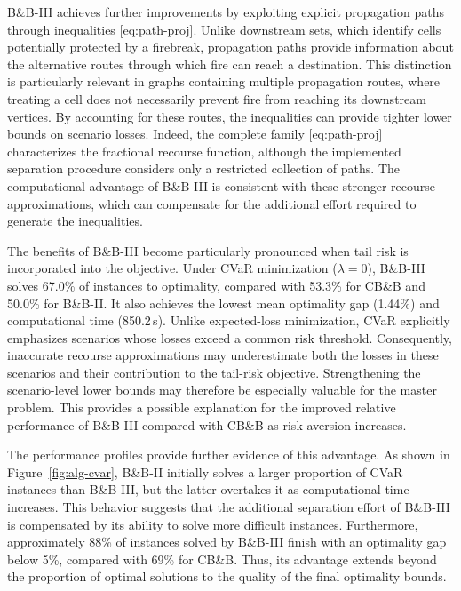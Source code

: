\documentclass{itor}
\begin{document}
B\&B-III achieves further improvements by exploiting explicit propagation paths through inequalities \eqref{eq:path-proj}. Unlike downstream sets, which identify cells potentially protected by a firebreak, propagation paths provide information about the
alternative routes through which fire can reach a destination. This distinction is particularly relevant in graphs containing multiple propagation routes, where treating a cell does not necessarily prevent fire from reaching its downstream vertices. By accounting for these routes, the inequalities can provide tighter
lower bounds on scenario losses. Indeed, the complete family \eqref{eq:path-proj} characterizes the fractional recourse function, although the implemented separation procedure considers only a restricted collection of paths. The computational advantage of
B\&B-III is consistent with these stronger recourse approximations,
which can compensate for the additional effort required to
generate the inequalities.

The benefits of B\&B-III become particularly pronounced when tail risk is incorporated into the objective. Under CVaR minimization ($\lambda=0$), B\&B-III solves 67.0\% of instances to optimality, compared with 53.3\% for CB\&B and 50.0\% for B\&B-II. It also achieves the lowest mean optimality gap (1.44\%) and computational time (850.2\,s). Unlike expected-loss minimization, CVaR explicitly emphasizes scenarios whose losses exceed a common risk threshold. Consequently, inaccurate recourse approximations may underestimate both the losses in these scenarios and their contribution to the tail-risk objective. Strengthening the scenario-level lower bounds may therefore be especially valuable for the master problem. This provides a possible explanation for the improved relative performance of B\&B-III compared with CB\&B as risk aversion increases.

The performance profiles provide further evidence of this advantage. As shown in Figure~\ref{fig:alg-cvar}, B\&B-II initially solves a larger proportion of CVaR instances than B\&B-III, but the latter overtakes it as computational time increases. This behavior suggests that the additional separation effort of B\&B-III is compensated by its ability to solve more difficult instances. Furthermore, approximately 88\% of instances solved by B\&B-III finish with an optimality gap below 5\%, compared with 69\% for CB\&B. Thus, its advantage extends beyond the proportion of optimal solutions to the quality of the final optimality bounds.
\end{document}
